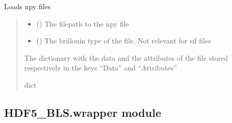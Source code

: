 \documentclass[letterpaper,10pt,english]{sphinxmanual}
\begin{document}
\begin{fulllineitems}
\label{\detokenize{source/HDF5_BLS:HDF5_BLS.load_data.load_sif_file}}
\pysigstartsignatures
\pysiglinewithargsret
{}
{\sphinxparamcomma {}\sphinxparamcomma {}}
{}
\pysigstopsignatures
\sphinxAtStartPar
Loads npy files
\begin{quote}\begin{description}
\begin{itemize}
\item {} 
\sphinxAtStartPar
{} () \textendash{} The filepath to the npy file

\item {} 
\sphinxAtStartPar
{} (\sphinxstyleliteralemphasis{\sphinxupquote{, }}) \textendash{} The brillouin type of the file. Not relevant for sif files

\end{itemize}

\sphinxAtStartPar
The dictionary with the data and the attributes of the file stored respectively in the keys “Data” and “Attributes”

\sphinxAtStartPar
dict

\end{description}\end{quote}

\end{fulllineitems}



\subsection{HDF5\_BLS.wrapper module}
\label{\detokenize{source/HDF5_BLS:module-HDF5_BLS.wrapper}}\label{\detokenize{source/HDF5_BLS:hdf5-bls-wrapper-module}}
\end{document}
